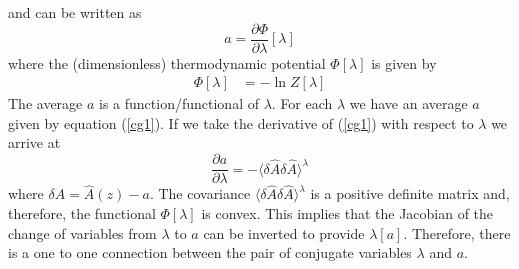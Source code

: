 \documentclass[b5paper,openright,10pt]{book}
\newcommand{\Tirar}[1]{{\color{Magenta}#1}}   %
\begin{document}
and can be written as 
\begin{equation}
a =\frac{\partial \Phi}{\partial
\lambda}[\lambda] 
\label{cg1}
\end{equation}
where the  (dimensionless) thermodynamic potential  $\Phi[\lambda]$ is
given by
\begin{align}
  \Phi[\lambda]&=-\ln Z[\lambda]
    \label{PhiLambda}
\end{align}
The average $a$  is a function/functional of  $\lambda$. For each
$\lambda$ we  have an average  $a$ given  by equation (\ref{cg1}).   If we
take the derivative of (\ref{cg1}) with respect to $\lambda$ we arrive
at
\begin{equation}
\frac{\partial a }{\partial \lambda}= -\langle \delta \hat{A}\delta
\hat{A}\rangle^\lambda
\label{covariances}
\end{equation}
where $\delta  A =  \hat{A}(z)-a$.  The  covariance $\langle  \delta \hat{A}\delta
\hat{A}\rangle^{\lambda}$ is a positive definite matrix and, therefore, the functional
$\Phi[\lambda]$  is convex.  This  implies that  the  Jacobian of  the
change of variables  from $\lambda$ to $a$ can be  inverted to provide
$\lambda[a]$.   Therefore, there  is  a  one to  one  connection
between the  pair of conjugate  variables $\lambda$ and  $a$.


\end{document}
